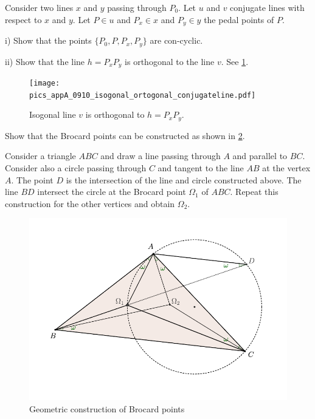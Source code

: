      \begin{exercise}\label{ex:7app}
 Consider two lines $x$ and $y$ passing through $P_0$.
 Let $ u$ and $v$ conjugate lines with respect to $x$ and $y$. Let $P\in u$ and $P_x\in x$ and $P_y\in y$ the pedal points of $P$. 
 
 \noindent i) Show that the points $\{P_0,P,P_x,P_y\} $
 are con-cyclic.
 
 \noindent ii) Show that the line $h=P_xP_y$ is orthogonal to the line $v$. See \cref{fig:isogonal_orthogonal}. 
 
 \begin{figure}[H]
    \centering
   \texttt{[image: pics\_appA\_0910\_isogonal\_ortogonal\_conjugateline.pdf]}
    \caption{ Isogonal line $v$ is orthogonal to  $h=P_xP_y$.
    \label{fig:isogonal_orthogonal}
    }
\end{figure}
 
    \end{exercise}
    
         \begin{exercise}\label{ex:8app}
         Show that the Brocard points can be  constructed as shown in \cref{fig:brocard_construction}.
         
         Consider a triangle $ABC$ and draw a line passing through $A$ and parallel to $BC$. Consider also a circle passing through $C$ and tangent to the line $AB$ at the vertex $A$. The point $D$ is the intersection of the line and circle constructed above.  The line $BD$ intersect the circle at the Brocard point $\Omega_1$ of $ABC$. Repeat this construction for the other vertices and obtain $\Omega_2.$
     
 \begin{figure}[H]
    \centering
   \includegraphics[scale=0.7]{zappA/pics/pics_appA_0930_brocard_points_construcao.pdf}
    \caption{ Geometric construction of Brocard points
    \label{fig:brocard_construction}
    }
\end{figure}
 
    \end{exercise}
    
